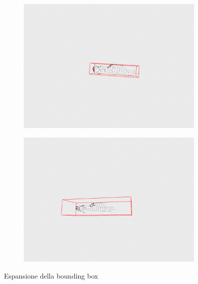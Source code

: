 \documentclass[italian]{report}
\begin{document}
\begin{figure}[H]
	\centering
	\begin{subfigure}{0.45\textwidth}
		\includegraphics[width=\textwidth]{notExpandedBox}
	\end{subfigure}
	\begin{subfigure}{0.45\textwidth}
		\includegraphics[width=\textwidth]{expandedBox}
	\end{subfigure}
	\footnotesize
	\caption{Espansione della bounding box}
\end{figure}
\end{document}
